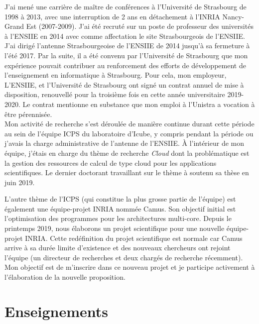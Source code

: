 J'ai mené une carrière de maître  de conférences à l'Université de Strasbourg de
1998 à 2013, avec une interruption de 2 ans en détachement à l'INRIA Nancy-Grand
Est (2007-2009).  J'ai été recruté sur  un poste de professeur des universités à
l'ENSIIE  en 2014  avec comme  affectation le  site Strasbourgeois  de l'ENSIIE.
J'ai dirigé l'antenne Strasbourgeoise de l'ENSIIE de 2014 jusqu'à sa fermeture à
l'été 2017. Par  la suite, il a  été convenu par l'Université  de Strasbourg que
mon expérience pouvait  contribuer au renforcement des  efforts de développement
de  l'enseignement en  informatique  à Strasbourg.   Pour  cela, mon  employeur,
L'ENSIIE, et  l'Université de Strasbourg ont  signé un contrat annuel  de mise à
disposition,  renouvellé pour  la troisième  fois en  cette année  universitaire
2019-2020.   Le contrat  mentionne en  substance que  mon emploi  à l'Unistra  a
vocation à être pérennisée.\\

Mon  activité de  recherche  s'est  déroulée de  manière  continue durant  cette
période au  sein de l'équipe ICPS  du laboratoire d'Icube, y  compris pendant la
période  ou  j'avais  la  charge  administrative de  l'antenne  de  l'ENSIIE.  À
l'intérieur de mon équipe, j'étais en  charge du thème de recherche \emph{Cloud}
dont la problématique est la gestion des ressources de calcul de type cloud pour
les applications scientifiques. Le dernier  doctorant travaillant sur le thème à
soutenu sa thèse  en juin 2019. 

L'autre thème  de l'ICPS (qui constitue  la plus grosse partie  de l'équipe) est
également  une  équipe-projet INRIA  nommée  Camus.   Son objectif  initial  est
l'optimisation  des programmes  pour  les architectures  multi-core.  Depuis  le
printemps  2019,  nous  élaborons  un  projet  scientifique  pour  une  nouvelle
équipe-projet INRIA.  Cette redéfinition du  projet scientifique est normale car
Camus  arrive à  sa  durée limite  d'existence et  des  nouveaux chercheurs  ont
rejoint  l'équipe (un  directeur  de  recherches et  deux  chargés de  recherche
récemment).   Mon objectif  est  de  m'inscrire dans  ce  nouveau  projet et  je
participe activement à l'élaboration de la nouvelle proposition.





\section{Enseignements}

